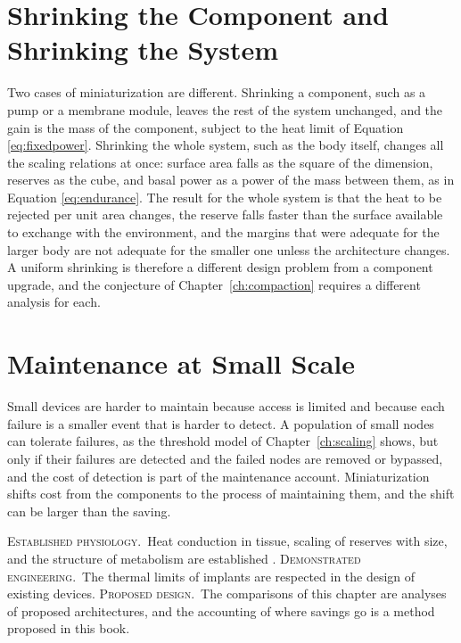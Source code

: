 \documentclass[11pt,openany]{book}
\theoremstyle{definition}
\theoremstyle{remark}
\newcommand{\est}{\textsc{Established physiology.}\ }
\newcommand{\dem}{\textsc{Demonstrated engineering.}\ }
\newcommand{\pro}{\textsc{Proposed design.}\ }
\begin{document}
\section{Shrinking the Component and Shrinking the System}

Two cases of miniaturization are different. Shrinking a component, such as a pump or a membrane module, leaves the rest of the system unchanged, and the gain is the mass of the component, subject to the heat limit of Equation \eqref{eq:fixedpower}. Shrinking the whole system, such as the body itself, changes all the scaling relations at once: surface area falls as the square of the dimension, reserves as the cube, and basal power as a power of the mass between them, as in Equation \eqref{eq:endurance}. The result for the whole system is that the heat to be rejected per unit area changes, the reserve falls faster than the surface available to exchange with the environment, and the margins that were adequate for the larger body are not adequate for the smaller one unless the architecture changes. A uniform shrinking is therefore a different design problem from a component upgrade, and the conjecture of Chapter~\ref{ch:compaction} requires a different analysis for each.

\section{Maintenance at Small Scale}

Small devices are harder to maintain because access is limited and because each failure is a smaller event that is harder to detect. A population of small nodes can tolerate failures, as the threshold model of Chapter~\ref{ch:scaling} shows, but only if their failures are detected and the failed nodes are removed or bypassed, and the cost of detection is part of the maintenance account. Miniaturization shifts cost from the components to the process of maintaining them, and the shift can be larger than the saving.

\begin{evidence}
\est Heat conduction in tissue, scaling of reserves with size, and the structure of metabolism are established \cite{kleiber1932,west1997,bsl2007}. \dem The thermal limits of implants are respected in the design of existing devices. \pro The comparisons of this chapter are analyses of proposed architectures, and the accounting of where savings go is a method proposed in this book.
\end{evidence}
\end{document}
